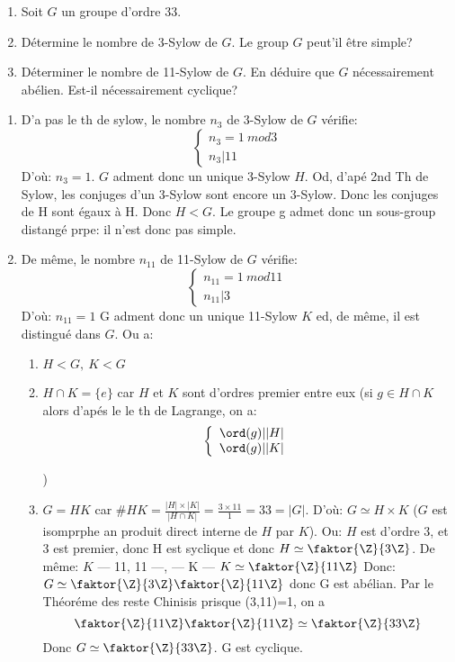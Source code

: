 \begin{examplebox}
	\begin{enumerate}
		\item Soit $G$ un groupe d'ordre 33.	
		\item Détermine le nombre de 3-Sylow de $G$. Le group $G$ peut'il être simple?
		\item Déterminer le nombre de 11-Sylow de $G$. En déduire que $G$ nécessairement abélien. Est-il nécessairement cyclique?
	\end{enumerate}
	
	\begin{enumerate}
		\item D'a pas le th de sylow, le nombre $n_3$ de 3-Sylow de $G$ vérifie:
		$$\left\{\begin{array}{r}n_3 = 1\ mod 3\\n_3 | 11\end{array}\right.$$
		D'où: $n_3=1$. $G$ adment donc un unique 3-Sylow $H$. Od, d'apé 2nd  Th de Sylow, les conjuges d'un 3-Sylow sont encore un 3-Sylow. Donc les conjuges de H sont égaux à H. Donc $H<  G$. Le groupe g admet donc un sous-group distangé prpe: il n'est donc pas simple.
		\item De même, le nombre $n_11$ de 11-Sylow de $G$ vérifie:
		$$\left\{\begin{array}{r}n_11 = 1\ mod 11\\n_11 | 3\end{array}\right.$$
		D'où: $n_11=1$
		G adment donc un unique 11-Sylow $K$ ed, de même, il est distingué dans $G$.
		Ou a:
		\begin{enumerate}
			\item $H<  G,\ K<  G$
			\item $H\cap K=\{e\}$ car $H$ et $K$ sont d'ordres premier entre eux (si $g\in H\cap K$ alors d'apés le le th de Lagrange, on a:
			$$\left\{\begin{array}{r}\ord(g)| |H|\\\ord(g)| |K|\end{array}\right.$$

			)
			\item $G=HK$ car $\#HK=\frac{|H|\times|K|}{|H\cap K|}=\frac{3\times 11}{1}=33=|G|$. D'où: $G\simeq H\times K$ ($G$ est isomprphe an produit direct interne de $H$ par $K$).
			Ou: $H$ est d'ordre 3, et 3 est premier, donc H est syclique et donc $H\simeq \faktor{\Z}{3\Z}$.
			De même: $K$ --- 11, 11 ---, --- K --- $K\simeq \faktor{\Z}{11\Z}$
			Donc: $G\simeq \faktor{\Z}{3\Z} \faktor{\Z}{11\Z}$ donc G est abélian. Par le Théoréme des reste Chinisis prisque (3,11)=1, on a 
			$$\faktor{\Z}{11\Z}\faktor{\Z}{11\Z}\simeq\faktor{\Z}{33\Z}$$
			Donc $G\simeq \faktor{\Z}{33\Z}$. G est cyclique.
		\end{enumerate}
	\end{enumerate}
\end{examplebox}

